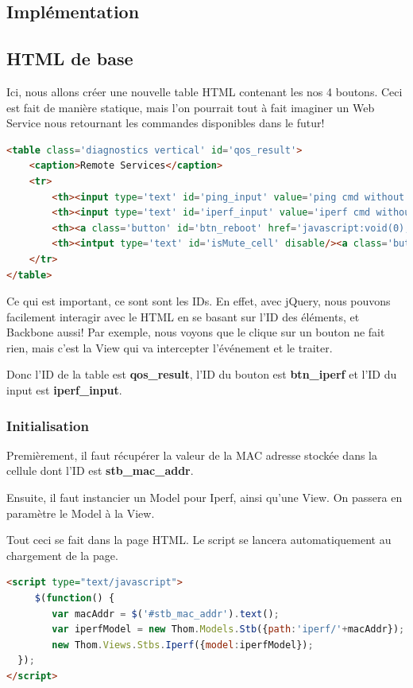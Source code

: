 \subsection{Implémentation}
\subsection{HTML de base}
Ici, nous allons créer une nouvelle table HTML contenant les nos 4 boutons. Ceci est fait de manière statique, mais l'on pourrait tout à fait imaginer un Web Service nous retournant les commandes disponibles dans le futur!
\begin{lstlisting}[language=HTML, caption={Table HTLM}]
<table class='diagnostics vertical' id='qos_result'>
	<caption>Remote Services</caption>
	<tr>
		<th><input type='text' id='ping_input' value='ping cmd without the ping'/><a class='button' id='btn_ping' href='javascript:void(0);'>Ping</a></th>
		<th><input type='text' id='iperf_input' value='iperf cmd without the iperf'/><a class='button' id='btn_iperf' href='javascript:void(0);'>Iperf</a></th>
		<th><a class='button' id='btn_reboot' href='javascript:void(0);'>Reboot</a></th>
		<th><intput type='text' id='isMute_cell' disable/><a class='button' id='btn_isMute' href='javascript:void(0);'>Is Mute</a></th>
	</tr>
</table>
\end{lstlisting}

Ce qui est important, ce sont sont les IDs. En effet, avec jQuery, nous pouvons facilement interagir avec le HTML en se basant sur l'ID des éléments, et Backbone aussi! Par exemple, nous voyons que le clique sur un bouton ne fait rien, mais c'est la View qui va intercepter l'événement et le traiter.

\medskip

Donc l'ID de la table est \textbf{qos\_result}, l'ID du bouton est \textbf{btn\_iperf} et l'ID du input est \textbf{iperf\_input}.
\subsubsection{Initialisation}
Premièrement, il faut récupérer la valeur de la MAC adresse stockée dans la cellule dont l'ID est \textbf{stb\_mac\_addr}.

Ensuite, il faut instancier un Model pour Iperf, ainsi qu'une View. On passera en paramètre le Model à la View.

Tout ceci se fait dans la page HTML. Le script se lancera automatiquement au chargement de la page.

\begin{lstlisting}[language=HTML, caption={Initialisation du Model et de la Vue}]
<script type="text/javascript">
	 $(function() {
	 	var macAddr = $('#stb_mac_addr').text();
	 	var iperfModel = new Thom.Models.Stb({path:'iperf/'+macAddr});
    	new Thom.Views.Stbs.Iperf({model:iperfModel});
  });
</script>
\end{lstlisting}

